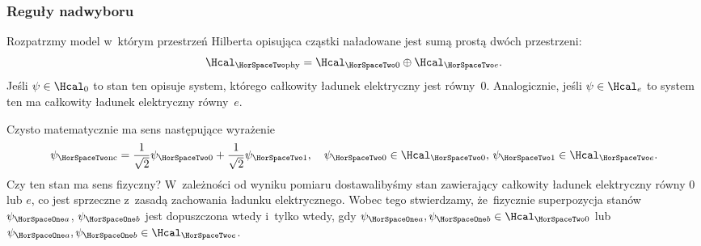 \documentclass[10pt,t]{beamer}
\begin{document}
\begin{frame}
  \frametitle{Reguły nadwyboru}


  Rozpatrzmy model w~którym przestrzeń Hilberta opisująca cząstki
  naładowane jest sumą prostą dwóch przestrzeni:
  \begin{equation}
    \label{eq:Czym-sa-problemy-ETC-03}
    \Hcal_{ \HorSpaceTwo \text{phy} } =
    \Hcal_{ \HorSpaceTwo 0 } \oplus \Hcal_{ \HorSpaceTwo e }.
  \end{equation}
  Jeśli $\psi \in \Hcal_{ 0 }$ to stan ten opisuje system, którego całkowity
  ładunek elektryczny jest równy~$0$. Analogicznie, jeśli
  $\psi \in \Hcal_{ e }$ to system ten ma całkowity ładunek elektryczny
  równy~$e$.

  Czysto matematycznie ma sens następujące wyrażenie
  \begin{equation}
    \label{eq:Czym-sa-problemy-ETC-04}
    \psi_{ \HorSpaceTwo \text{nc} } =
    \frac{ 1 }{ \sqrt{ 2 } } \psi_{ \HorSpaceTwo 0 } +
    \frac{ 1 }{ \sqrt{ 2 } } \psi_{ \HorSpaceTwo 1 }, \quad
    \psi_{ \HorSpaceTwo 0 } \in \Hcal_{ \HorSpaceTwo 0 }, \,
    \psi_{ \HorSpaceTwo 1 } \in \Hcal_{ \HorSpaceTwo e }.
  \end{equation}
  Czy ten stan ma sens fizyczny? W~zależności od wyniku pomiaru
  dostawalibyśmy stan zawierający całkowity ładunek elektryczny równy
  $0$ lub $e$, co jest sprzeczne z~zasadą zachowania ładunku elektrycznego.
  Wobec tego stwierdzamy, że~\alert{fizycznie} superpozycja stanów
  $\psi_{ \HorSpaceOne a }$, $\psi_{ \HorSpaceOne b }$ jest dopuszczona wtedy i~tylko
  wtedy, gdy $\psi_{ \HorSpaceOne a }, \psi_{ \HorSpaceOne b } \in \Hcal_{ \HorSpaceTwo 0 }$
  lub $\psi_{ \HorSpaceOne a }, \psi_{ \HorSpaceOne b } \in \Hcal_{ \HorSpaceTwo e }$.

\end{frame}
\end{document}
